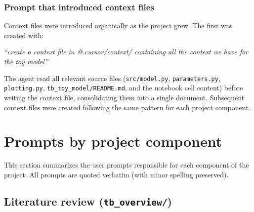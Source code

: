 \documentclass[11pt]{article}
\begin{document}
\subsubsection{Prompt that introduced context files}

Context files were introduced organically as the project grew. The first was created with:

\begin{promptbox}
\textit{``create a context file in @.cursor/context/ containing all the context we have for the toy model''}
\end{promptbox}

\noindent The agent read all relevant source files (\texttt{src/model.py}, \texttt{parameters.py}, \texttt{plotting.py}, \texttt{tb\_toy\_model/README.md}, and the notebook cell content) before writing the context file, consolidating them into a single document. Subsequent context files were created following the same pattern for each project component.

\section{Prompts by project component}

This section summarizes the user prompts responsible for each component of the project. All prompts are quoted verbatim (with minor spelling preserved).

\subsection{Literature review (\texttt{tb\_overview/})}
\end{document}
